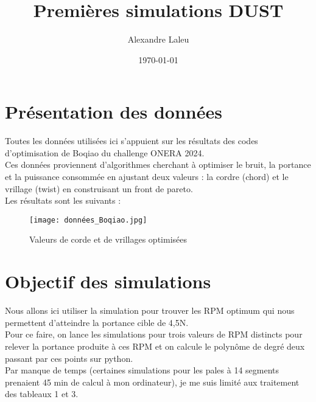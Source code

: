 \documentclass{article}
\title{Premières simulations DUST}
\author{Alexandre Laleu}
\date{\today}
\begin{document}
	
	\maketitle
	\section{Présentation des données}
	Toutes les données utilisées ici s'appuient sur les résultats des codes d'optimisation de Boqiao du challenge ONERA 2024. \\Ces données proviennent d'algorithmes cherchant à optimiser le bruit, la portance et la puissance consommée en ajustant deux valeurs : la cordre (chord) et le vrillage (twist) en construisant un front de pareto.\\
	Les résultats sont les suivants : 
	\begin{figure}[h]
		\centering
		\texttt{[image: données\_Boqiao.jpg]}
		\caption{Valeurs de corde et de vrillages optimisées}
		\label{fig:image}
	\end{figure}
	\section{Objectif des simulations}
	Nous allons ici utiliser la simulation pour trouver les RPM optimum qui nous permettent d'atteindre la portance cible de 4,5N.\\
	Pour ce faire, on lance les simulations pour trois valeurs de RPM distincts pour relever la portance produite à ces RPM et on calcule le polynôme de degré deux passant par ces points sur python.\\
	Par manque de temps (certaines simulations pour les pales à 14 segments prenaient 45 min de calcul à mon ordinateur), je me suis limité aux traitement des tableaux 1 et 3.
	
	
\end{document}

